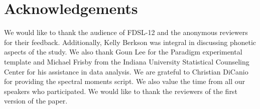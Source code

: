 \documentclass[output=paper,modfonts,newtxmath,hidelinks,]{langscibook}
\begin{document}
\section*{Acknowledgements}

We would like to thank the audience of FDSL-12 and the anonymous reviewers for their feedback. Additionally, Kelly Berkson was integral in discussing phonetic aspects of the study. We also thank Goun Lee for the Paradigm experimental template and Michael Frisby from the Indiana University Statistical Counseling Center for his assistance in data analysis. We are grateful to Christian DiCanio for providing the spectral moments script. We also value the time from all our speakers who participated. We would like to thank the reviewers of the first version of the paper.

\largerpage
\sloppy
\printbibliography[heading=subbibliography,notkeyword=this]
\end{document}

